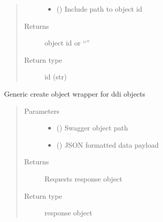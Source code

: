 \documentclass[letterpaper,10pt,english]{sphinxmanual}
\begin{document}
\begin{fulllineitems}
\begin{fulllineitems}
\begin{quote}
\begin{description}
\begin{itemize}
\item {} 
\sphinxAtStartPar
{} () \textendash{} Include path to object id

\end{itemize}

\item[{Returns}] \leavevmode
\sphinxAtStartPar
object id or “”

\item[{Return type}] \leavevmode
\sphinxAtStartPar
id (str)

\end{description}\end{quote}

\end{fulllineitems}


\begin{fulllineitems}
\label{\detokenize{b1ztp-class:bloxone.b1ztp.update}}
\sphinxAtStartPar
Generic create object wrapper for ddi objects
\begin{quote}\begin{description}
\item[{Parameters}] \leavevmode\begin{itemize}
\item {} 
\sphinxAtStartPar
{} () \textendash{} Swagger object path

\item {} 
\sphinxAtStartPar
{} () \textendash{} JSON formatted data payload

\end{itemize}

\item[{Returns}] \leavevmode
\sphinxAtStartPar
Requests response object

\item[{Return type}] \leavevmode
\sphinxAtStartPar
response object

\end{description}\end{quote}

\end{fulllineitems}


\end{fulllineitems}
\end{document}
